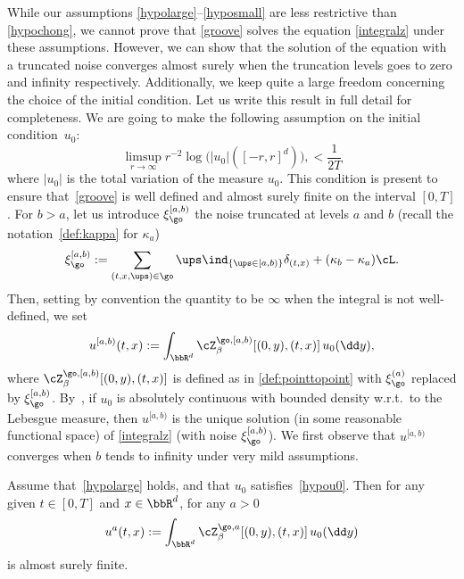 While our assumptions \eqref{hypolarge}--\eqref{hyposmall} are less restrictive than \eqref{hypochong},
we cannot prove that \eqref{groove} solves the equation \eqref{integralz} under these assumptions. However, we can show that the solution of the equation with a truncated noise converges almost surely when the truncation levels goes to zero and infinity respectively. Additionally, we keep quite a large freedom concerning the choice of the initial condition.
Let us write this result in full detail for completeness.
We are going to make the following assumption
on the initial condition~$u_0$:
\begin{equation}
\label{hypou0}
\limsup_{r\to \infty} r^{-2} \log \bigl(|u_0|([-r,r]^d) \bigr),
< \frac{1}{2T}
\end{equation}
where
$|u_0|$ is the total variation of the measure $u_0$.
This condition is present to ensure that~\eqref{groove} is well defined
and almost surely finite on the interval $[0,T]$.
For $b>a$, let us introduce $\xi^{[a,b)}_\go$ the noise truncated at levels $a$ and $b$ (recall the notation~\eqref{def:kappa} for $\kappa_a$)
\begin{equation}\label{splitnoise}
\xi^{[a,b)}_\go:= \sum_{(t,x,\ups)\in \go} \ups \ind_{\{\ups \in[a,b)\}}\delta_{(t,x)}+(\kappa_b- \kappa_a) \cL.
\end{equation}
Then, setting by convention the quantity to be $\infty$ when the integral is not well-defined, we set
\begin{equation}\label{defuab}
u^{[a,b)}(t,x) := \int_{\bbR^d}
\cZ^{\go,[a,b)}_{\beta}[(0,y),(t,x)] \, u_0(\dd y),
\end{equation}
where $\cZ^{\go,[a,b)}_{\beta}[(0,y),(t,x)]$ is defined as in \eqref{def:pointtopoint} with $\xi^{(a)}_{\go}$ replaced by $\xi^{[a,b)}_{\go}$.
By~\hbox{\cite[Th.\,1.2.1]{Loubert98}}, if $u_0$ is absolutely continuous with bounded density w.r.t.\ to the Lebesgue measure, then $u^{[a,b)}$ is the unique solution (in some reasonable functional space) of \eqref{integralz} (with noise $\xi_{\go}^{[a,b)}$).
We first observe that $u^{[a,b)}$ converges when $b$ tends to infinity under very mild assumptions.

\begin{proposition}\label{lem:SHE}
Assume that~\eqref{hypolarge} holds,
and that $u_0$ satisfies~\eqref{hypou0}.
Then for any given $t \in [0,T]$ and $x\in \bbR^d$,
for any $a >0$\vspace*{-3pt}
\begin{equation}\label{lemilem}
u^a(t,x):= \int_{\bbR^d}
\cZ^{\go,a}_{\beta}[(0,y),(t,x)] \, u_0(\dd y)
\end{equation}
is almost surely finite.
\end{proposition}


